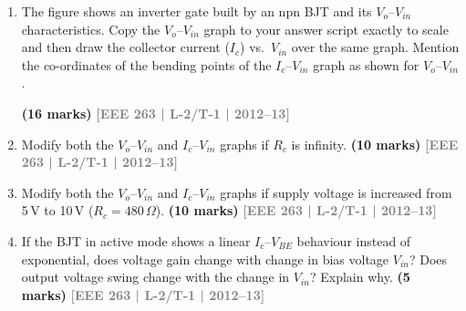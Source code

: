 \documentclass[12pt,a3paper]{article}
\newcommand{\yr}[1]{\hfill\textcolor{gray}{\small\textbf{[#1]}}}
\newcommand{\mk}[1]{\textcolor{orange!70!black}{\small\textbf{(#1 marks)}}}
\begin{document}
\begin{enumerate}
\begin{enumerate}
\begin{center}
\end{center}


\item The figure shows an inverter gate built by an npn BJT and its $V_o$--$V_{in}$ characteristics. Copy the $V_o$--$V_{in}$ graph to your answer script exactly to scale and then draw the collector current ($I_c$) vs.\ $V_{in}$ over the same graph. Mention the co-ordinates of the bending points of the $I_c$--$V_{in}$ graph as shown for $V_o$--$V_{in}$.

\mk{16} \yr{EEE 263 | L-2/T-1 | 2012--13}

\item Modify both the $V_o$--$V_{in}$ and $I_c$--$V_{in}$ graphs if $R_c$ is infinity.
\mk{10} \yr{EEE 263 | L-2/T-1 | 2012--13}

\item Modify both the $V_o$--$V_{in}$ and $I_c$--$V_{in}$ graphs if supply voltage is increased from 5\,V to 10\,V ($R_c=480\,\Omega$).
\mk{10} \yr{EEE 263 | L-2/T-1 | 2012--13}

\item If the BJT in active mode shows a linear $I_c$--$V_{BE}$ behaviour instead of exponential, does voltage gain change with change in bias voltage $V_{in}$? Does output voltage swing change with the change in $V_{in}$? Explain why.
\mk{5} \yr{EEE 263 | L-2/T-1 | 2012--13}

\end{enumerate}

\end{enumerate}
\end{document}
